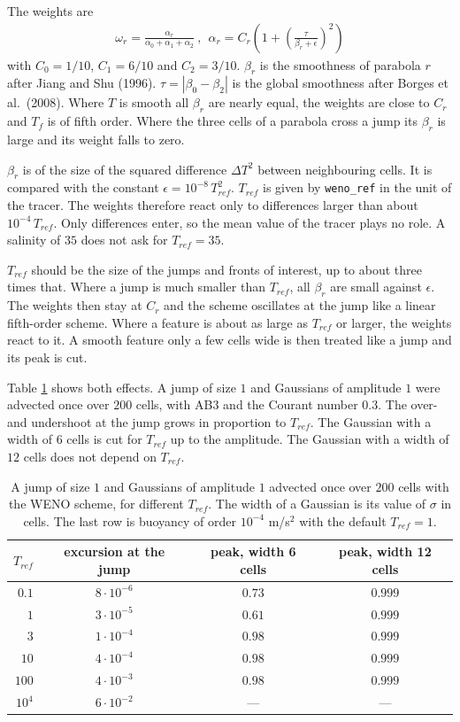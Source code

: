 \documentclass[12pt]{article}
\newcommand{\beeq}  { \begin{eqnarray*} }
\newcommand{\eeeq}  { \end{eqnarray*}}
\newcommand{\lk}{\left(}
\newcommand{\rk}{\right)}
\begin{document}
The weights are
\beeq
\omega_r = \frac{\alpha_r}{\alpha_0 + \alpha_1 + \alpha_2} ~,~~
\alpha_r = C_r \lk 1 + \lk \frac{\tau}{\beta_r + \epsilon} \rk^2 \rk
\eeeq
with $C_0 = 1/10$, $C_1 = 6/10$ and $C_2 = 3/10$.
$\beta_r$ is the smoothness of parabola $r$ after Jiang and Shu (1996).
$\tau = |\beta_0 - \beta_2|$ is the global smoothness after Borges et al.\ (2008).
Where $T$ is smooth all $\beta_r$ are nearly equal, the weights are close to $C_r$ and $T_f$ is of fifth order.
Where the three cells of a parabola cross a jump its $\beta_r$ is large and its weight falls to zero.

$\beta_r$ is of the size of the squared difference $\Delta T^2$ between neighbouring cells.
It is compared with the constant $\epsilon = 10^{-8}\, T_{ref}^2$.
$T_{ref}$ is given by \verb|weno_ref| in the unit of the tracer.
The weights therefore react only to differences larger than about $10^{-4}\, T_{ref}$.
Only differences enter, so the mean value of the tracer plays no role.
A salinity of $35$ does not ask for $T_{ref} = 35$.

$T_{ref}$ should be the size of the jumps and fronts of interest, up to about three times that.
Where a jump is much smaller than $T_{ref}$, all $\beta_r$ are small against $\epsilon$.
The weights then stay at $C_r$ and the scheme oscillates at the jump like a linear fifth-order scheme.
Where a feature is about as large as $T_{ref}$ or larger, the weights react to it.
A smooth feature only a few cells wide is then treated like a jump and its peak is cut.

Table \ref{tab:weno_ref} shows both effects.
A jump of size $1$ and Gaussians of amplitude $1$ were advected once over $200$ cells, with AB3 and the Courant number $0.3$.
The over- and undershoot at the jump grows in proportion to $T_{ref}$.
The Gaussian with a width of $6$ cells is cut for $T_{ref}$ up to the amplitude.
The Gaussian with a width of $12$ cells does not depend on $T_{ref}$.

\begin{table}[h]
\begin{center}
\begin{tabular}{@{}rccc@{}}
\hline
$T_{ref}$ & excursion at the jump & peak, width 6 cells & peak, width 12 cells \\
\hline
$0.1$ & $8 \cdot 10^{-6}$ & $0.73$ & $0.999$ \\
$1$ & $3 \cdot 10^{-5}$ & $0.61$ & $0.999$ \\
$3$ & $1 \cdot 10^{-4}$ & $0.98$ & $0.999$ \\
$10$ & $4 \cdot 10^{-4}$ & $0.98$ & $0.999$ \\
$100$ & $4 \cdot 10^{-3}$ & $0.98$ & $0.999$ \\
$10^{4}$ & $6 \cdot 10^{-2}$ & --- & --- \\
\hline
\end{tabular}
\end{center}
\caption{A jump of size $1$ and Gaussians of amplitude $1$ advected once over $200$ cells with the WENO scheme, for different $T_{ref}$.
The width of a Gaussian is its value of $\sigma$ in cells.
The last row is buoyancy of order $10^{-4}$ m/s$^2$ with the default $T_{ref} = 1$.}
\label{tab:weno_ref}
\end{table}
\end{document}
